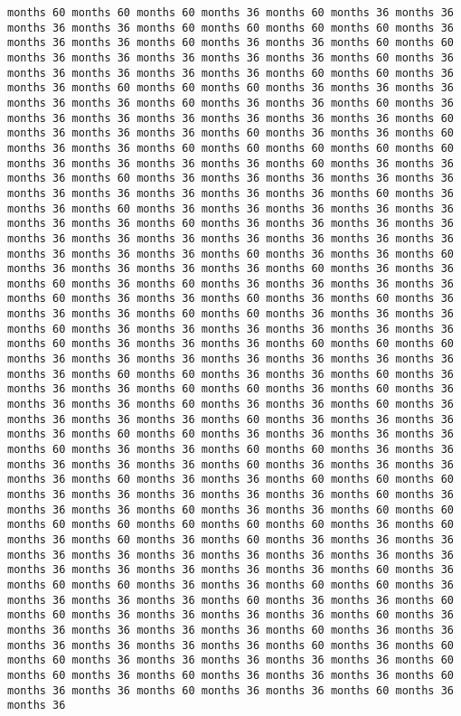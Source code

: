 \documentclass[11pt]{article}
\begin{document}
\begin{Verbatim}[commandchars=\\\{\}, frame=single, framerule=2mm, rulecolor=\color{outerrorbackground}]
months 60 months 60 months 60 months 36 months 60 months 36 months 36 months 36 months 36 months 60 months 60 months 60 months 60 months 36 months 36 months 36 months 60 months 36 months 36 months 60 months 60 months 36 months 36 months 36 months 36 months 36 months 60 months 36 months 36 months 36 months 36 months 36 months 60 months 60 months 36 months 36 months 60 months 60 months 60 months 36 months 36 months 36 months 36 months 36 months 60 months 36 months 36 months 60 months 36 months 36 months 36 months 36 months 36 months 36 months 36 months 60 months 36 months 36 months 36 months 60 months 36 months 36 months 60 months 36 months 36 months 60 months 60 months 60 months 60 months 60 months 36 months 36 months 36 months 36 months 60 months 36 months 36 months 36 months 60 months 36 months 36 months 36 months 36 months 36 months 36 months 36 months 36 months 36 months 36 months 60 months 36 months 36 months 60 months 36 months 36 months 36 months 36 months 36 months 36 months 36 months 60 months 36 months 36 months 36 months 36 months 36 months 36 months 36 months 36 months 36 months 36 months 36 months 36 months 36 months 36 months 60 months 36 months 36 months 60 months 36 months 36 months 36 months 36 months 60 months 36 months 36 months 60 months 36 months 60 months 36 months 36 months 36 months 36 months 60 months 36 months 36 months 60 months 36 months 60 months 36 months 36 months 36 months 60 months 60 months 36 months 36 months 36 months 60 months 36 months 36 months 36 months 36 months 36 months 36 months 60 months 36 months 36 months 36 months 60 months 60 months 60 months 36 months 36 months 36 months 36 months 36 months 36 months 36 months 36 months 60 months 60 months 36 months 36 months 60 months 36 months 36 months 36 months 60 months 60 months 36 months 60 months 36 months 36 months 36 months 60 months 36 months 36 months 60 months 36 months 36 months 36 months 36 months 60 months 36 months 36 months 36 months 36 months 60 months 60 months 36 months 36 months 36 months 36 months 60 months 36 months 36 months 60 months 60 months 36 months 36 months 36 months 36 months 36 months 60 months 36 months 36 months 36 months 36 months 60 months 36 months 36 months 60 months 60 months 60 months 36 months 36 months 36 months 36 months 36 months 60 months 36 months 36 months 36 months 60 months 36 months 36 months 60 months 60 months 60 months 60 months 60 months 60 months 60 months 36 months 60 months 36 months 60 months 36 months 60 months 36 months 36 months 36 months 36 months 36 months 36 months 36 months 36 months 36 months 36 months 36 months 36 months 36 months 36 months 36 months 60 months 36 months 60 months 60 months 36 months 36 months 60 months 60 months 36 months 36 months 36 months 36 months 60 months 36 months 36 months 60 months 60 months 36 months 36 months 36 months 36 months 60 months 36 months 36 months 36 months 36 months 36 months 60 months 36 months 36 months 36 months 36 months 36 months 36 months 60 months 36 months 60 months 60 months 36 months 36 months 36 months 36 months 36 months 60 months 60 months 36 months 60 months 36 months 36 months 36 months 60 months 36 months 36 months 60 months 36 months 36 months 60 months 36 months 36 
\end{Verbatim}
\end{document}
